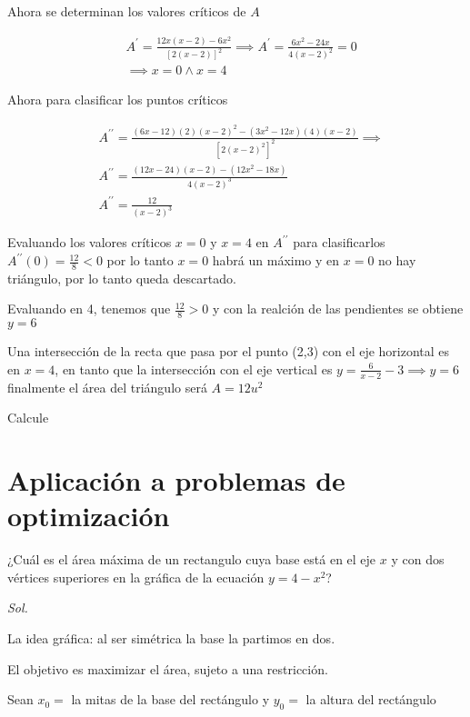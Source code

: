 Ahora se determinan los valores críticos de $A$

\begin{align*}
	 & A^{\prime}=\frac{12x(x-2)-6x^2}{[2(x-2)]^2 }\implies A^{\prime}=\frac{6x^2-24x}{4(x-2)^2}=0 \\
	 & \implies x=0\land x=4
\end{align*}

Ahora para clasificar los puntos críticos

\begin{align*}
	 & A^{\prime\prime}=\frac{(6x-12)(2)(x-2)^2-(3x^2-12x)(4)(x-2)}{[2(x-2)^2]^2}\implies \\
	 & A^{\prime\prime}=\frac{(12x-24)(x-2)-(12x^2-18x)}{4(x-2)^3}                        \\
	 & A^{\prime\prime}= \frac{12}{(x-2)^3}
\end{align*}

Evaluando los valores críticos $x=0$ y $x=4$ en $A^{\prime\prime}$ para clasificarlos
$A^{\prime\prime}(0)=\frac{12}{8}<0$ por lo tanto $x=0$ habrá un máximo y en $x=0$ no hay triángulo, por lo tanto queda descartado.

Evaluando en 4, tenemos que $\frac{12}{8}>0$ y con la realción de las pendientes se obtiene $y=6$


Una intersección de la recta que pasa por el punto (2,3) con el eje horizontal es en $x=4$, en tanto que la intersección con el
eje vertical es $y=\frac{6}{x-2}-3\implies y=6$ finalmente el área del triángulo será $A=12u^2$

\begin{example}
	Calcule
\end{example}

\section{Aplicación a problemas de optimización}

\begin{example}
	¿Cuál es el área máxima de un rectangulo cuya base está en el eje $x$ y con dos vértices superiores en la gráfica de la ecuación $y=4-x^2$?
\end{example}

\textit{ Sol. }

La idea gráfica: al ser simétrica la base la partimos en dos.

El objetivo es maximizar el área, sujeto a una restricción.

Sean $x_0=$ la mitas de la base del rectángulo y $y_0=$ la altura del rectángulo

